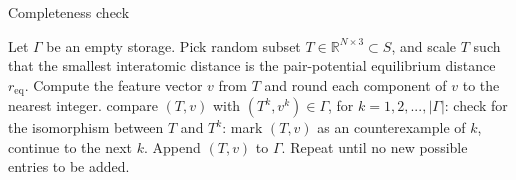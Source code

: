 \documentclass[12pt]{article}
\begin{document}
\begin{algorithm}
    \caption{Completeness check}
    \label{alg:completeness_check}
    \begin{algorithmic}[1] 
            \State Let $\Gamma$ be an empty storage.
            \State Pick random subset $T \in \mathbb{R}^{N \times 3} \subset S$, 
            and scale $T$ such that the smallest interatomic distance is the pair-potential equilibrium distance $r_\text{eq}$.
            \State Compute the feature vector $v$ from $T$ and round each component of $v$ to the nearest integer.
            \If{$\Gamma \neq \emptyset$}
                \State compare $(T,v)$ with $(T^k, v^k) \in \Gamma$, 
                for $k = 1,2,...,|\Gamma|$: 
                    \State check for the isomorphism between $T$ and $T^k$:
                        \State mark $(T, v)$ as an counterexample of $k$,
                        \State continue to the next $k$.
                    \EndIf
                \EndIf
            \EndIf
            \State Append $(T,v)$ to $\Gamma$.
            \State Repeat until no new possible entries to be added. 
        \EndFor
    \end{algorithmic}
\end{algorithm}
\end{document}
